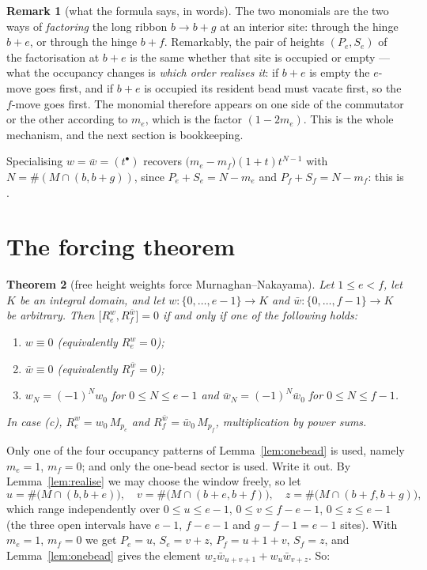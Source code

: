 \documentclass[11pt]{article}
\newtheorem{theorem}{Theorem}
\theoremstyle{definition}
\newtheorem{remark}[theorem]{Remark}
\newcommand{\Mult}[1]{M_{#1}}
\begin{document}
\begin{remark}[what the formula says, in words]\label{rem:hinge}
The two monomials are the two ways of \emph{factoring} the long ribbon $b\to b+g$ at an
interior site: through the hinge $b+e$, or through the hinge $b+f$.  Remarkably, the pair
of heights $(P_e,S_e)$ of the factorisation at $b+e$ is the same whether that site is
occupied or empty --- what the occupancy changes is \emph{which order realises it}: if
$b+e$ is empty the $e$-move goes first, and if $b+e$ is occupied its resident bead must
vacate first, so the $f$-move goes first.  The monomial therefore appears on one side of
the commutator or the other according to $m_e$, which is the factor $(1-2m_e)$.  This is
the whole mechanism, and the next section is bookkeeping.
\end{remark}

Specialising $w=\bar w=(t^\bullet)$ recovers
$\bigl(m_e-m_f\bigr)(1+t)t^{N-1}$ with $N=\#(M\cap(b,b+g))$, since
$P_e+S_e=N-m_e$ and $P_f+S_f=N-m_f$: this is \cite[Thm.~5(1)]{Clio0907}.

\section{The forcing theorem}

\begin{theorem}[free height weights force Murnaghan--Nakayama]\label{thm:main}
Let $1\le e<f$, let $K$ be an integral domain, and let $w:\{0,\dots,e-1\}\to K$ and
$\bar w:\{0,\dots,f-1\}\to K$ be arbitrary.  Then
$\bigl[R_e^{w},R_f^{\bar w}\bigr]=0$ if and only if one of the following holds:
\begin{enumerate}
\item[(a)] $w\equiv0$ (equivalently $R_e^{w}=0$);
\item[(b)] $\bar w\equiv0$ (equivalently $R_f^{\bar w}=0$);
\item[(c)] $w_N=(-1)^{N}w_0$ for $0\le N\le e-1$ \emph{and}
           $\bar w_N=(-1)^{N}\bar w_0$ for $0\le N\le f-1$.
\end{enumerate}
In case (c), $R_e^{w}=w_0\,\Mult{p_e}$ and $R_f^{\bar w}=\bar w_0\,\Mult{p_f}$,
multiplication by power sums.
\end{theorem}

Only one of the four occupancy patterns of Lemma~\ref{lem:onebead} is used, namely
$m_e=1$, $m_f=0$; and only the one-bead sector is used.  Write it out.  By
Lemma~\ref{lem:realise} we may choose the window freely, so let
\[
  u=\#\bigl(M\cap(b,b+e)\bigr),\quad v=\#\bigl(M\cap(b+e,b+f)\bigr),\quad
  z=\#\bigl(M\cap(b+f,b+g)\bigr),
\]
which range independently over $0\le u\le e-1$, $0\le v\le f-e-1$, $0\le z\le e-1$
(the three open intervals have $e-1$, $f-e-1$ and $g-f-1=e-1$ sites).  With $m_e=1$,
$m_f=0$ we get $P_e=u$, $S_e=v+z$, $P_f=u+1+v$, $S_f=z$, and Lemma~\ref{lem:onebead}
gives the element $w_z\bar w_{u+v+1}+w_u\bar w_{v+z}$.  So:
\end{document}
